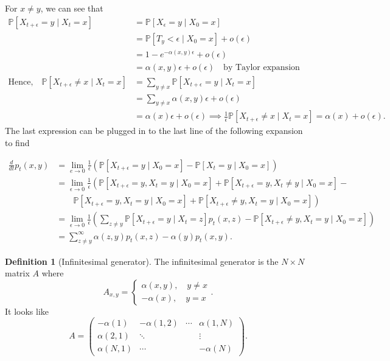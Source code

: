 \documentclass{tufte-handout}
\renewcommand*\P{\mathbb{P}}
\theoremstyle{definition}
\newtheorem{defn}[thm]{Definition}
\begin{document}
 For $x \ne y$, we can see that
\begin{align*}
	\P\left[X_{t+\epsilon} = y \mid X_t = x\right] &= \P\left[X_{\epsilon} = y \mid X_0 = x\right] \\
	&= \P\left[T_y < \epsilon \mid X_0 = x\right] + o(\epsilon)  \\
	&= 1- e^{-\alpha(x,y) \epsilon} + o(\epsilon) \\
	&= \alpha(x,y)\epsilon + o(\epsilon) \quad \text{by Taylor expansion}\\
	\text{Hence,} \quad \P\left[X_{t+\epsilon} \ne x \mid X_t = x\right] &= \sum\limits_{y \ne x}^{} \P\left[X_{t+\epsilon} = y \mid X_t = x\right] \\
																		 &= \sum\limits_{y\ne x}^{} \alpha(x,y)\epsilon + o(\epsilon) \\
																		 &= \alpha(x)\epsilon + o(\epsilon)
																		 \implies \frac{1}{\epsilon}\P\left[X_{t+\epsilon} \ne x \mid X_t= x\right] = \alpha(x) + o(\epsilon)
.\end{align*}
The last expression can be plugged in to the last line of the following expansion to find

\begin{align*}
	\frac{d}{dt} p_t(x,y) &= \lim\limits_{e \to 0} \frac{1}{\epsilon} \left( \P\left[X_{t+\epsilon} = y \mid X_0 = x\right] - \P\left[X_t = y \mid X_0 = x\right]  \right) \\
						  &= \lim\limits_{\epsilon \to 0} \frac{1}{\epsilon}\left( \P\left[X_{t+\epsilon} = y, X_t = y \mid X_0 = x\right] + \P\left[X_{t + \epsilon} = y, X_t \ne y \mid X_0=x\right] - \right. \\
						  & \qquad\left. \P\left[X_{t + \epsilon} = y, X_t = y \mid X_0 = x\right] + \P\left[X_{t+\epsilon} \ne y, X_t = y \mid X_0 = x\right]  \right) \\
	&= \lim\limits_{\epsilon \to 0} \frac{1}{\epsilon}\left( \sum\limits_{z \ne y}^{} \P\left[X_{t + \epsilon} = y \mid X_t = z\right] p_t(x,z) - \P\left[X_{t+\epsilon} \ne y, X_t = y \mid X_0 = x\right] \right) \\
	&= \sum\limits_{z \ne y}^{\infty}  \alpha(z,y)p_t(x,z) - \alpha(y)p_t(x,y)
.\end{align*}

\begin{defn}[Infinitesimal generator]
	The infinitesimal generator is the $N\times N$ matrix $A$ where \[
		A_{x,y} = \begin{cases}
			\alpha(x,y), \quad y \ne x \\
			-\alpha(x), \quad y = x
		\end{cases}
	.\] It looks like \[
		A = \begin{pmatrix}
		    -\alpha(1) & -\alpha(1,2) & \cdots & \alpha(1,N) \\
			\alpha(2,1) & \ddots & & \vdots \\
			\alpha(N,1) & \cdots & & -\alpha(N)
		\end{pmatrix} 
	.\] 
\end{defn}
\end{document}
